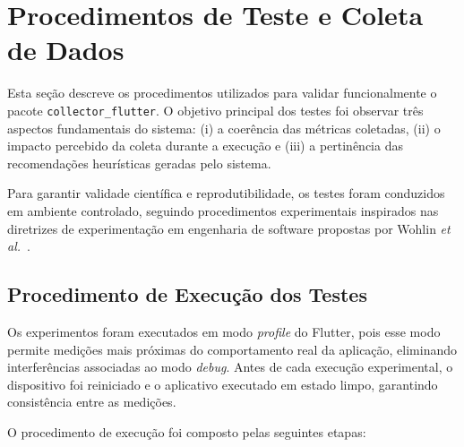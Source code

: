 \section{Procedimentos de Teste e Coleta de Dados}

Esta seção descreve os procedimentos utilizados para validar funcionalmente o pacote \texttt{collector\_flutter}. O objetivo principal dos testes foi observar três aspectos fundamentais do sistema: (i) a coerência das métricas coletadas, (ii) o impacto percebido da coleta durante a execução e (iii) a pertinência das recomendações heurísticas geradas pelo sistema.

Para garantir validade científica e reprodutibilidade, os testes foram conduzidos em ambiente controlado, seguindo procedimentos experimentais inspirados nas diretrizes de experimentação em engenharia de software propostas por Wohlin \textit{et al.}~\cite{wohlin2012}.

\subsection{Procedimento de Execução dos Testes}

Os experimentos foram executados em modo \textit{profile} do Flutter, pois esse modo permite medições mais próximas do comportamento real da aplicação, eliminando interferências associadas ao modo \textit{debug}. Antes de cada execução experimental, o dispositivo foi reiniciado e o aplicativo executado em estado limpo, garantindo consistência entre as medições.

O procedimento de execução foi composto pelas seguintes etapas:

